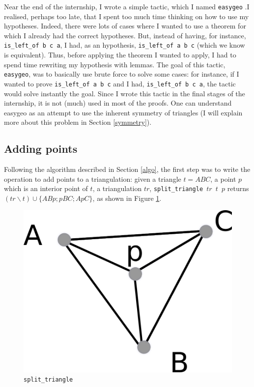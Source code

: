 \documentclass[a4paper,10pt]{article}
\begin{document}
Near the end of the internship, I wrote a simple tactic, which I named {\tt easygeo} \label{easygeo}.I realised, perhaps too late, that I spent too much time thinking on how to use my hypotheses. Indeed, there were lots of cases where I wanted to use a theorem for which I already had the correct hypotheses. But, instead of having, for instance, {\tt is\_left\_of b c a}, I had, as an hypothesis, {\tt is\_left\_of a b c} (which we know is equivalent). Thus, before applying the theorem I wanted to apply, I had to spend time rewriting my hypothesis with lemmas. The goal of this tactic, {\tt easygeo}, was to basically use brute force to solve some cases: for instance, if I wanted to prove {\tt is\_left\_of a b c} and I had, {\tt is\_left\_of b c a}, the tactic would solve instantly the goal. Since I wrote this tactic in the final stages of the internship, it is not (much) used in most of the proofs. One can understand easygeo as an attempt to use the inherent symmetry of triangles (I will explain more about this problem in Section \ref{symmetry}).
\label{easygeo}
\subsection{Adding points}
\label{theorem1}
Following the algorithm described in Section \ref{algo}, the first step was to write the operation to add points to a triangulation: given a triangle $t = ABC$, a point $p$ which is an interior point of $t$, a triangulation $tr$, {\tt split\_triangle $tr$ $t$ $p$} returns $(tr \smallsetminus t) \cup \{ABp;pBC;ApC\}$, as shown in Figure \ref{split_triangle}.
\begin{figure}
  \centering
  \includegraphics[scale=2]{split_triangle}
    \caption{\label{split_triangle} {\tt split\_triangle}}
\end{figure}
\end{document}
